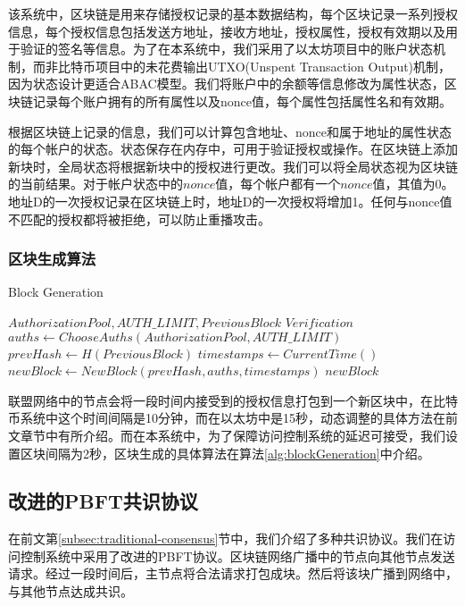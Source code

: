 该系统中，区块链是用来存储授权记录的基本数据结构，每个区块记录一系列授权信息，每个授权信息包括发送方地址，接收方地址，授权属性，授权有效期以及用于验证的签名等信息。为了在本系统中，我们采用了以太坊项目中的账户状态机制，而非比特币项目中的未花费输出UTXO(Unspent Transaction Output)机制，因为状态设计更适合ABAC模型。我们将账户中的余额等信息修改为属性状态，区块链记录每个账户拥有的所有属性以及nonce值，每个属性包括属性名和有效期。

根据区块链上记录的信息，我们可以计算包含地址、nonce和属于地址的属性状态的每个帐户的状态。状态保存在内存中，可用于验证授权或操作。在区块链上添加新块时，全局状态将根据新块中的授权进行更改。我们可以将全局状态视为区块链的当前结果。对于帐户状态中的$nonce$值，每个帐户都有一个$nonce$值，其值为0。地址D的一次授权记录在区块链上时，地址D的一次授权将增加1。任何与nonce值不匹配的授权都将被拒绝，可以防止重播攻击。

\subsubsection{区块生成算法}

 \begin{algorithm}
 \caption{Block Generation}\label{alg:blockGeneration}
   \begin{algorithmic}[!htbp]
   \renewcommand{\algorithmicrequire}{\textbf{Input:}}
   \renewcommand{\algorithmicensure}{\textbf{Output:}}
   \REQUIRE $AuthorizationPool, AUTH\_LIMIT, PreviousBlock$
   \ENSURE  $Verification$
    \STATE $auths \gets ChooseAuths(AuthorizationPool, AUTH\_LIMIT)$
    \STATE $prevHash \gets H(PreviousBlock)$
    \STATE $timestamps \gets CurrentTime()$
    \STATE $newBlock \gets NewBlock(prevHash, auths, timestamps)$
   \RETURN $newBlock$
   \end{algorithmic}
 \end{algorithm}

联盟网络中的节点会将一段时间内接受到的授权信息打包到一个新区块中，在比特币系统中这个时间间隔是10分钟，而在以太坊中是15秒，动态调整的具体方法在前文章节中有所介绍。而在本系统中，为了保障访问控制系统的延迟可接受，我们设置区块间隔为2秒，区块生成的具体算法在算法\ref{alg:blockGeneration}中介绍。

\subsection{改进的PBFT共识协议}
\label{subsec:adapted-pbft}

在前文第\ref{subsec:traditional-consensus}节中，我们介绍了多种共识协议。我们在访问控制系统中采用了改进的PBFT协议。区块链网络广播中的节点向其他节点发送请求。经过一段时间后，主节点将合法请求打包成块。然后将该块广播到网络中，与其他节点达成共识。

